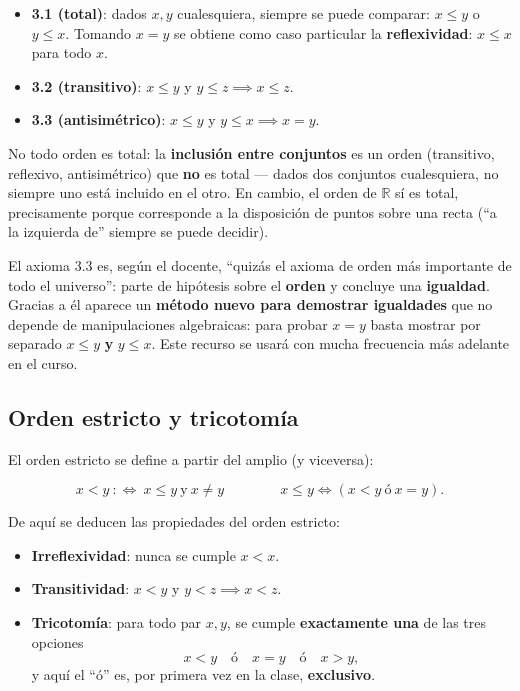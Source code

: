 \documentclass[12pt,a4paper]{article}
\begin{document}
\begin{itemize}
  \item \textbf{3.1 (total)}: dados $x,y$ cualesquiera, siempre se puede
    comparar: $x\le y$ o $y\le x$. Tomando $x=y$ se obtiene como caso
    particular la \textbf{reflexividad}: $x\le x$ para todo $x$.
  \item \textbf{3.2 (transitivo)}: $x\le y$ y $y\le z \implies x\le z$.
  \item \textbf{3.3 (antisimétrico)}: $x\le y$ y $y\le x \implies x=y$.
\end{itemize}

\begin{notebox}
No todo orden es total: la \textbf{inclusión entre conjuntos} es un orden
(transitivo, reflexivo, antisimétrico) que \textbf{no} es total --- dados
dos conjuntos cualesquiera, no siempre uno está incluido en el otro. En
cambio, el orden de $\mathbb{R}$ sí es total, precisamente porque
corresponde a la disposición de puntos sobre una recta (``a la izquierda
de'' siempre se puede decidir).
\end{notebox}

\begin{keybox}
El axioma 3.3 es, según el docente, ``quizás el axioma de orden más
importante de todo el universo'': parte de hipótesis sobre el
\textbf{orden} y concluye una \textbf{igualdad}. Gracias a él aparece un
\textbf{método nuevo para demostrar igualdades} que no depende de
manipulaciones algebraicas: para probar $x=y$ basta mostrar por separado
$x\le y$ \textbf{y} $y\le x$. Este recurso se usará con mucha frecuencia
más adelante en el curso.
\end{keybox}

\subsection{Orden estricto y tricotomía}

El orden estricto se define a partir del amplio (y viceversa):

\begin{keybox}
\[
\boxed{x < y \ :\Longleftrightarrow\ x\le y \ \text{y} \ x\ne y}
\qquad\qquad
x \le y \iff (x<y \ \text{ó} \ x=y).
\]
\end{keybox}

De aquí se deducen las propiedades del orden estricto:

\begin{itemize}
  \item \textbf{Irreflexividad}: nunca se cumple $x<x$.
  \item \textbf{Transitividad}: $x<y$ y $y<z \implies x<z$.
  \item \textbf{Tricotomía}: para todo par $x,y$, se cumple
    \textbf{exactamente una} de las tres opciones
    \[
    x<y \quad \text{ó} \quad x=y \quad \text{ó} \quad x>y,
    \]
    y aquí el ``ó'' es, por primera vez en la clase, \textbf{exclusivo}.
\end{itemize}
\end{document}
